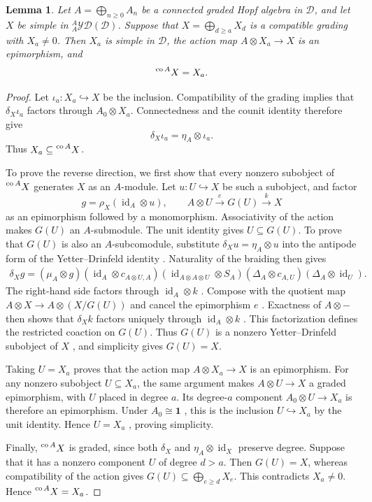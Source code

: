 \documentclass[11pt, a4paper]{article}
\numberwithin{equation}{section}
\newcommand{\D}{\mathcal D}
\newcommand{\YD}{\mathcal{YD}}
\newcommand{\one}{\mathbf 1}
\DeclareMathOperator{\id}{id}
\DeclareMathOperator{\co}{co}
\newtheorem{lemma}[theorem]{Lemma}
\begin{document}
\begin{lemma}\label{refl:lowest}
Let $A=\bigoplus_{n\geq0}A_n$ be a connected graded Hopf algebra in $\D$,
and let $X$ be simple  {in} ${}^{A}_{A}\YD(\D)$.
Suppose that $X=\bigoplus_{d\geq a}X_d$ is a compatible grading
with $X_a\neq0$.
Then $X_a$ is simple in $\D$, the action map $A\otimes X_a\to X$ is an
epimorphism, and
\[
 \prescript{\co A}{}{X}=X_a.
\]
\end{lemma}

\begin{proof}
 {Let} $  \iota_a:X_a\hookrightarrow X   $  {be the inclusion.}
Compatibility of the grading  {implies that} $\delta_X  \iota_a   $
 {factors through} $A_0\otimes X_a$.
 {Connectedness and} the counit identity  {therefore give}
\[
 \delta_X  \iota_a   =\eta_A\otimes  \iota_a   .
\]
Thus $X_a\subseteq\prescript{\co A}{}{X}$.

To prove the reverse direction,
we first show that every nonzero subobject of
$\prescript{\co A}{}{X}$ generates $X$ as an $A$-module.
Let $u:U\hookrightarrow X$ be such a subobject, and  {factor}
\[
 g=\rho_X(\id_A\otimes u),
 \qquad
   A\otimes U\xrightarrow{e}   G(U)  \xrightarrow{k}X   
\]
 {as an epimorphism followed by a monomorphism}.
Associativity of the action makes $G(U)$ an $A$-submodule.
The unit identity gives $U\subseteq G(U)$.
To prove that $G(U)$ is also an $A$-subcomodule,
substitute $\delta_Xu=\eta_A\otimes u$ into the
antipode form of the Yetter--Drinfeld identity
\cite[Remark~3.3]{Simon}.
Naturality of the braiding then gives
\[
 \begin{aligned}
 \delta_Xg
 =(\mu_A\otimes g)
   (\id_A\otimes c_{A\otimes U,A})
   (\id_{A\otimes A\otimes U}\otimes S_A)
   (\Delta_A\otimes c_{A,U})
   (\Delta_A\otimes\id_U).
 \end{aligned}
\]
The right-hand side factors through $  \id_A\otimes k   $ {.
Compose with the quotient map} $A\otimes   X\to A\otimes(X/G(U))   $
 {and cancel the epimorphism} $  e   $ {.
Exactness of} $  A\otimes-   $  {then shows that} $  \delta_Xk   $
 {factors uniquely through} $  \id_A\otimes k   $ {.
This factorization defines the restricted coaction on} $G(U)$.
 {Thus} $G(U)$ is a nonzero Yetter--Drinfeld subobject of $X$ {,
and simplicity} gives $G(U)=X$.

Taking $U=X_a$ proves that the action map
$A\otimes X_a\to X$ is an epimorphism.
 {For any nonzero subobject} $U\subseteq X_a$, the  {same} argument
 {makes} $  A\otimes    U  \to    X$  {a graded epimorphism},  {with} $U$  {placed}
in degree $a$.
 {Its degree-}$  a   $  {component} $A_0\otimes U  \to    X_a$  {is therefore
an epimorphism.
Under} $  A_0\cong\one   $ {, this is the inclusion} $U  \hookrightarrow X_a   $
 {by} the unit identity.  {Hence} $U=X_a$ {, proving simplicity}.

Finally, $\prescript{\co A}{}{X}$ is graded, since
both $\delta_X$ and $\eta_A\otimes\id_X$ preserve degree.
Suppose that it has a nonzero component $U$ of
degree $d>a$.
 {Then} $G(U)=X$,  {whereas} compatibility of the action  {gives}
$
 G(U)\subseteq\bigoplus_{e\geq d}X_e.
$
This contradicts $X_a\neq0$.
 {Hence} $\prescript{\co A}{}{X}=X_a$.

\end{proof}
\end{document}
